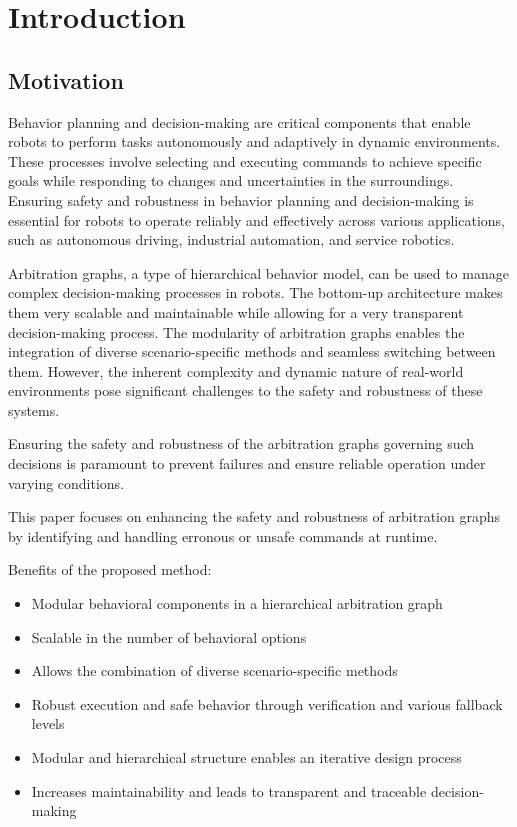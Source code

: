 \section{Introduction}

\subsection{Motivation}

Behavior planning and decision-making are critical components that enable robots to perform tasks autonomously and adaptively in dynamic environments.
These processes involve selecting and executing commands to achieve specific goals while responding to changes and uncertainties in the surroundings.
Ensuring safety and robustness in behavior planning and decision-making is essential for robots to operate reliably and effectively across various applications, such as autonomous driving, industrial automation, and service robotics.

Arbitration graphs, a type of hierarchical behavior model, can be used to manage complex decision-making processes in robots.
The bottom-up architecture makes them very scalable and maintainable while allowing for a very transparent decision-making process.
The modularity of arbitration graphs enables the integration of diverse scenario-specific methods and seamless switching between them.
However, the inherent complexity and dynamic nature of real-world environments pose significant challenges to the safety and robustness of these systems.

Ensuring the safety and robustness of the arbitration graphs governing such decisions is paramount to prevent failures and ensure reliable operation under varying conditions.

This paper focuses on enhancing the safety and robustness of arbitration graphs by identifying and handling erronous or unsafe commands at runtime.

Benefits of the proposed method:
\begin{itemize}
    \item Modular behavioral components in a hierarchical arbitration graph
    \item Scalable in the number of behavioral options
    \item Allows the combination of diverse scenario-specific methods
    \item Robust execution and safe behavior through verification and various fallback levels
    \item Modular and hierarchical structure enables an iterative design process
    \item Increases maintainability and leads to transparent and traceable decision-making
\end{itemize}

